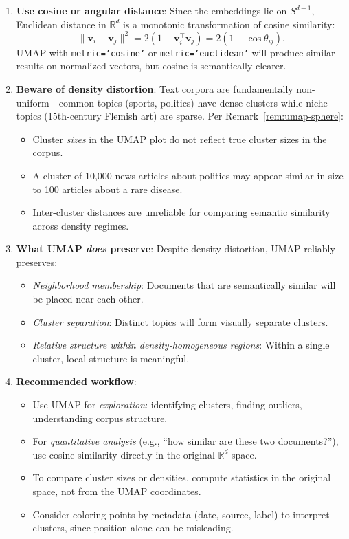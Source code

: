 \begin{remark}\label{rem:umap-text-embeddings}\leavevmode
  \begin{enumerate}
    \item \textbf{Use cosine or angular distance}: Since the embeddings lie on $S^{d-1}$, Euclidean distance in $\mathbb{R}^d$ is a monotonic transformation of cosine similarity:
    \[
      \|\mathbf{v}_i - \mathbf{v}_j\|^2 = 2(1 - \mathbf{v}_i^\top \mathbf{v}_j) = 2(1 - \cos\theta_{ij}).
    \]
    UMAP with \texttt{metric='cosine'} or \texttt{metric='euclidean'} will produce similar results on normalized vectors, but cosine is semantically clearer.

    \item \textbf{Beware of density distortion}: Text corpora are fundamentally non-uniform---common topics (sports, politics) have dense clusters while niche topics (15th-century Flemish art) are sparse. Per Remark~\ref{rem:umap-sphere}:
    \begin{itemize}
      \item Cluster \emph{sizes} in the UMAP plot do not reflect true cluster sizes in the corpus.
      \item A cluster of 10,000 news articles about politics may appear similar in size to 100 articles about a rare disease.
      \item Inter-cluster distances are unreliable for comparing semantic similarity across density regimes.
    \end{itemize}

    \item \textbf{What UMAP \emph{does} preserve}: Despite density distortion, UMAP reliably preserves:
    \begin{itemize}
      \item \emph{Neighborhood membership}: Documents that are semantically similar will be placed near each other.
      \item \emph{Cluster separation}: Distinct topics will form visually separate clusters.
      \item \emph{Relative structure within density-homogeneous regions}: Within a single cluster, local structure is meaningful.
    \end{itemize}

    \item \textbf{Recommended workflow}:
    \begin{itemize}
      \item Use UMAP for \emph{exploration}: identifying clusters, finding outliers, understanding corpus structure.
      \item For \emph{quantitative analysis} (e.g., ``how similar are these two documents?''), use cosine similarity directly in the original $\mathbb{R}^d$ space.
      \item To compare cluster sizes or densities, compute statistics in the original space, not from the UMAP coordinates.
      \item Consider coloring points by metadata (date, source, label) to interpret clusters, since position alone can be misleading.
    \end{itemize}


\end{enumerate}
\end{remark}
